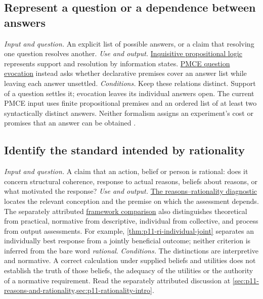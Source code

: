 \subsection{Represent a question or a dependence between answers}
\label{sec:p14-finder-question-language}
\textit{Input and question.} An explicit list of possible answers, or a claim
that resolving one question resolves another.
\textit{Use and output.}
\hyperref[sec:p08-inquisitive-propositional]{Inquisitive propositional logic}
represents support and resolution by information states.
\hyperref[sec:p18-question-evocation]{PMCE question evocation} instead asks
whether declarative premises cover an answer list while leaving each answer
unsettled.
\textit{Conditions.} Keep these relations distinct. Support of a question
settles it; evocation leaves its individual answers open. The current PMCE
input uses finite propositional premises and an ordered list of at least two
syntactically distinct answers. Neither formalism assigns an experiment's cost
or promises that an answer can be obtained
\cite{Ciardelli2023InquisitivePropositional,Wisniewski2016QuestionEvocation}.

\subsection{Identify the standard intended by rationality}
\label{sec:p14-finder-rationality}
\textit{Input and question.} A claim that an action, belief or person is
rational: does it concern structural coherence, response to actual reasons,
beliefs about reasons, or what motivated the response?
\textit{Use and output.}
\hyperref[def:p11-reasons-diagnostic]{The reasons--rationality diagnostic}
locates the relevant conception and the premise on which the assessment
depends. The separately attributed
\hyperref[def:p11-ri-framework-comparison]{framework comparison}
also distinguishes theoretical from practical, normative from descriptive,
individual from collective, and process from output assessments. For
example, \cref{thm:p11-ri-individual-joint} separates an individually
best response from a jointly beneficial outcome; neither criterion
is inferred from the bare word \emph{rational}.
\textit{Conditions.} The distinctions are interpretive and normative. A
correct calculation under supplied beliefs and utilities does not establish
the truth of those beliefs, the adequacy of the utilities or the authority of
a normative requirement. Read the separately attributed discussion at
\cref{sec:p11-reasons-and-rationality,sec:p11-rationality-intro}.

